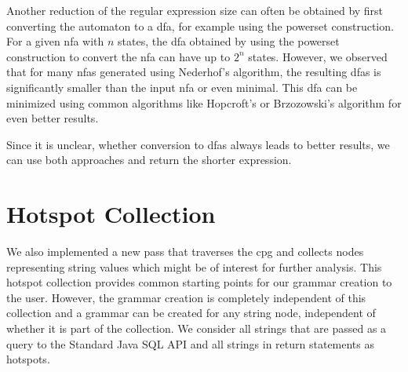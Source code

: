 Another reduction of the regular expression size can often be obtained by first converting the automaton to a \ac{dfa}, for example using the powerset construction. For a given \ac{nfa} with $n$ states, the \ac{dfa} obtained by using the powerset construction to convert the \ac{nfa} can have up to $2^n$ states. However, we observed that for many \acp{nfa} generated using Nederhof's algorithm, the resulting \acp{dfa} is significantly smaller than the input \ac{nfa} or even minimal. This \ac{dfa} can be minimized using common algorithms like Hopcroft's or Brzozowski's algorithm for even better results.

Since it is unclear, whether conversion to \acp{dfa} always leads to better results, we can use both approaches and return the shorter expression.

% 


\section{Hotspot Collection} 
We also implemented a new pass that traverses the \ac{cpg} and collects nodes representing string values which might be of interest for further analysis. 
This hotspot collection provides common starting points for our grammar creation to the user. However, the grammar creation is completely independent of this collection and a grammar can be created for any string node, independent of whether it is part of the collection.
We consider all strings that are passed as a query to the Standard Java SQL API and all strings in return statements as hotspots.
